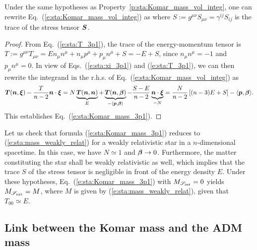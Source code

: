 \begin{prop}
Under the same hypotheses as Property~\ref{p:sta:Komar_mass_vol_integ},
one can rewrite Eq.~(\ref{e:sta:Komar_mass_vol_integ}) as
\be \label{e:sta:Komar_mass_3p1}
\ee
where $S := g^{\mu\nu} S_{\mu\nu} = \gamma^{ij} S_{ij}$
is the trace of the stress tensor $\bm{S}$.
\end{prop}
\begin{proof}
From Eq.~(\ref{e:sta:T_3p1}), the trace of the energy-momentum tensor
is $T := g^{\mu\nu} T_{\mu\nu} = E n_\mu n^\mu + n_\mu p^\mu + p_\mu n^\mu + S = - E + S$,
since $n_\mu n^\mu = - 1$ and $p_\mu n^\mu = 0$.
In view of Eqs.~(\ref{e:sta:xi_3p1}) and (\ref{e:sta:T_3p1}), we can then rewrite
the integrand in the r.h.s. of Eq.~(\ref{e:sta:Komar_mass_vol_integ}) as
\[
 \bm{T}(\bm{n}, \bm{\xi}) - \frac{T}{n-2} \bm{n}\cdot \bm{\xi} =
 N \underbrace{\bm{T}(\bm{n}, \bm{n})}_{E}
 + \underbrace{\bm{T}(\bm{n}, \bm{\beta})}_{-\langle \bm{p}, \bm{\beta} \rangle}
 - \frac{S - E}{n-2} \underbrace{\bm{n}\cdot \bm{\xi}}_{-N}
 =  \frac{N}{n-2} \left[ (n-3) E + S \right] - \langle \bm{p}, \bm{\beta} \rangle .
\]
This establishes Eq.~(\ref{e:sta:Komar_mass_3p1}).
\end{proof}

\begin{example}
\label{x:sta:Komar_mass_star_dim_n}
Let us check that formula (\ref{e:sta:Komar_mass_3p1}) reduces
to (\ref{e:sta:mass_weakly_relat}) for a weakly relativistic
star in a $n$-dimensional spacetime.
In this case, we have $N\simeq 1$ and
$\bm{\beta} \to 0$. Furthermore,
the matter constituting the star shall
be weakly relativistic as well, which implies that the trace $S$ of the stress
tensor is negligible in front of the energy density $E$. Under these
hypotheses, Eq.~(\ref{e:sta:Komar_mass_3p1}) with $M_{\mathscr{S}_{\rm int}} =0$
yields $M_{\mathscr{S}_{\rm ext}} = M$, where
$M$ is given by (\ref{e:sta:mass_weakly_relat}),
given that $T_{00} \simeq E$.
\end{example}

\subsection{Link between the Komar mass and the ADM mass}  \label{s:sta:Komar_ADM}

